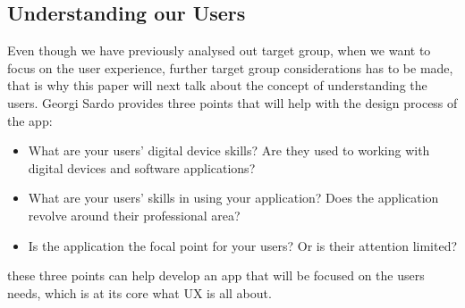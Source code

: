 \subsection{Understanding our Users}
Even though we have previously analysed out target group, when we want to focus on the user experience, further target group considerations has to be made, that is why this paper will next talk about the concept of understanding the users. Georgi Sardo provides three points that will help with the design process of the app:
\begin{itemize}
\item What are your users’ digital device skills? Are they used to working with digital devices and software applications?\cite{Sardo}
\item What are your users’ skills in using your application? Does the application revolve around their professional area?\cite{Sardo}
\item Is the application the focal point for your users? Or is their attention limited?\cite{Sardo}
\end{itemize}
these three points can help develop an app that will be focused on the users needs, which is at its core what UX is all about.
